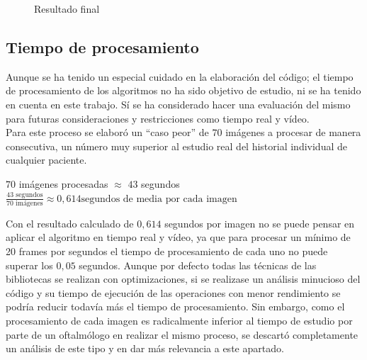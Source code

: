 \begin{enumerate}
\begin{enumerate}[label*=\arabic*.]
\begin{enumerate}[label*=\arabic*.]
      \begin{figure}[H]
        \caption{Resultado final}
        \centering \setlength\fboxsep{0pt} \setlength\fboxrule{0.5pt}
      \end{figure}

    \end{enumerate}
  \end{enumerate}
\end{enumerate}

\subsection{Tiempo de procesamiento}
Aunque se ha tenido un especial cuidado en la elaboración del código;
el tiempo de procesamiento de los algoritmos no ha sido objetivo de
estudio, ni se ha tenido en cuenta en este trabajo. Sí se ha
considerado hacer una evaluación del mismo para futuras
consideraciones y restricciones como tiempo
real y vídeo.\\
Para este proceso se elaboró un ``caso peor'' de $70$ imágenes a
procesar de manera consecutiva, un número muy superior al estudio real
del historial individual de cualquier paciente.\\
\begin{center}
  $70$ imágenes procesadas $\approx$ $43$ segundos
  \\[0.5cm]
  $\frac{43 \text{ segundos}}{70 \text{ imágenes}} \approx 0,614 \text{
    segundos de media por cada imagen}$
\end{center}
Con el resultado calculado de $0,614$ segundos por imagen no se puede
pensar en aplicar el algoritmo en tiempo real y vídeo, ya que para procesar
un mínimo de 20 frames por segundos el tiempo de procesamiento de cada uno
no puede superar los $0,05$ segundos. Aunque por
defecto todas las técnicas de las bibliotecas se realizan con
optimizaciones, si se realizase un análisis minucioso del código y su
tiempo de ejecución de las operaciones con menor rendimiento se podría
reducir todavía más el tiempo de procesamiento. Sin embargo, como el
procesamiento de cada imagen es radicalmente inferior al tiempo de
estudio por parte de un oftalmólogo en realizar el mismo proceso, se
descartó completamente un análisis de este tipo y en dar más
relevancia a este apartado.
